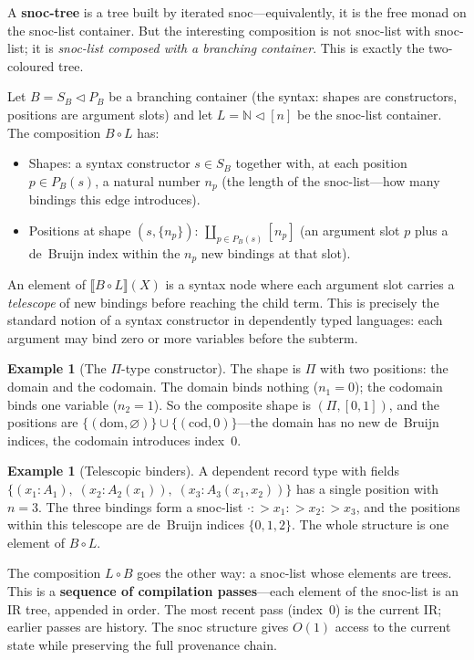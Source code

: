 \documentclass[11pt,a4paper]{article}
\theoremstyle{definition}
\newtheorem{example}[definition]{Example}
\theoremstyle{plain}
\newcommand{\cont}[2]{#1 \triangleleft #2}
\newcommand{\Ext}[1]{\llbracket #1 \rrbracket}
\begin{document}
A \textbf{snoc-tree} is a tree built by iterated snoc---equivalently,
it is the free monad on the snoc-list container. But the interesting
composition is not snoc-list with snoc-list; it is \emph{snoc-list
composed with a branching container}. This is exactly the two-coloured tree.

Let $B = \cont{S_B}{P_B}$ be a branching container (the syntax:
shapes are constructors, positions are argument slots) and let
$L = \cont{\mathbb{N}}{[n]}$ be the snoc-list container. The
composition $B \circ L$ has:
\begin{itemize}[nosep]
\item Shapes: a syntax constructor $s \in S_B$ together with, at each
  position $p \in P_B(s)$, a natural number $n_p$ (the length of the
  snoc-list---how many bindings this edge introduces).
\item Positions at shape $(s, \{n_p\})$: $\coprod_{p \in P_B(s)} [n_p]$
  (an argument slot $p$ plus a de~Bruijn index within the $n_p$ new
  bindings at that slot).
\end{itemize}
An element of $\Ext{B \circ L}(X)$ is a syntax node where each argument
slot carries a \emph{telescope} of new bindings before reaching the child
term. This is precisely the standard notion of a syntax constructor in
dependently typed languages: each argument may bind zero or more variables
before the subterm.

\begin{example}[The $\Pi$-type constructor]
The shape is $\Pi$ with two positions: the domain and the codomain.
The domain binds nothing ($n_1 = 0$); the codomain binds one variable
($n_2 = 1$). So the composite shape is $(\Pi, [0, 1])$, and the positions
are $\{(\text{dom}, \varnothing)\} \cup \{(\text{cod}, 0)\}$---the domain
has no new de~Bruijn indices, the codomain introduces index~0.
\end{example}

\begin{example}[Telescopic binders]
A dependent record type with fields
$\{(x_1 : A_1),\; (x_2 : A_2(x_1)),\; (x_3 : A_3(x_1, x_2))\}$
has a single position with $n = 3$. The three bindings form a snoc-list
$\cdot \mathbin{{:}{>}} x_1 \mathbin{{:}{>}} x_2 \mathbin{{:}{>}} x_3$,
and the positions within this telescope are de~Bruijn indices $\{0, 1, 2\}$.
The whole structure is one element of $B \circ L$.
\end{example}

The composition $L \circ B$ goes the other way: a snoc-list whose elements
are trees. This is a \textbf{sequence of compilation passes}---each
element of the snoc-list is an IR tree, appended in order. The most
recent pass (index~0) is the current IR; earlier passes are history. The
snoc structure gives $O(1)$ access to the current state while preserving
the full provenance chain.
\end{document}
